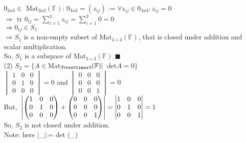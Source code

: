 \documentclass{article}
\begin{document}
$0_{3x3} \in$ Mat$_{3x3}(\mathbb{F})$: $0_{3x3} = (z_{ij}) := \forall
z_{ij} \in 0_{3x3}: z_{ij} = 0$\\
$\Rightarrow$ tr $0_{ij} = \sum_{i=1}^3 z_{ij} = \sum_{i=1}^3 0 = 0$\\
$\Rightarrow 0_{ij} \in S_1$\\

$\Rightarrow S_1$ is a non-empty subset of Mat$_{3×3}(\mathbb{F})$, that is
closed under addition and scalar multiplication.\\
So, $S_1$ is a subspace of Mat$_{3×3}(\mathbb{F})$ $\blacksquare$\\

(2) $S_2 = \{A \in $Mat$_{3×3}(\mathbb{F}) |\enskip $det$ A = 0\}$\\

$
\begin{vmatrix}
  1&0&0\\
  0&1&0\\
  0&0&0
\end{vmatrix}=0
$
and
$\begin{vmatrix}
  0&0&0\\
  0&0&0\\
  0&0&1
\end{vmatrix}=0$\\

But,
$\\
\begin{vmatrix}
\begin{pmatrix}
  1&0&0\\
  0&1&0\\
  0&0&0
\end{pmatrix}
+
\begin{pmatrix}
  0&0&0\\
  0&0&0\\
  0&0&1
\end{pmatrix}
\end{vmatrix}
=
\begin{vmatrix}
  1&0&0\\
  0&1&0\\
  0&0&1
\end{vmatrix}
=1
$\\

So, $S_2$ is not closed under addition.\\
Note: here |\_|:= det (\_)
\end{document}
